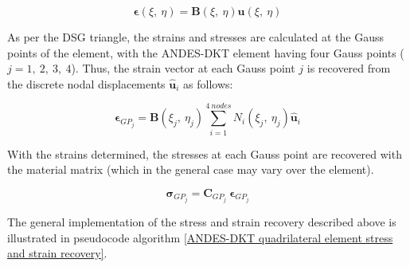 \begin{equation} 
\boldsymbol{\epsilon}(\xi,\ \eta) = \mathbf{B}(\xi,\ \eta) \mathbf{u}(\xi,\ \eta)
\label{eqqrec2}
\end{equation}

As per the DSG triangle, the strains and stresses are calculated at the Gauss points of the element, with the ANDES-DKT element having four Gauss points ($j = 1,\ 2,\ 3,\ 4$). Thus, the strain vector at each Gauss point $j$ is recovered from the discrete nodal displacements $\hat{\mathbf{u}}_i$ as follows:

\begin{equation} 
\boldsymbol{\epsilon}_{GP_j} = \mathbf{B}(\xi_j,\ \eta_j) \sum_{i=1}^{4\ nodes} N_i(\xi_j,\ \eta_j) \hat{\mathbf{u}}_i
\label{eqqrec3}
\end{equation}

With the strains determined, the stresses at each Gauss point are recovered with the material matrix (which in the general case may vary over the element).

\begin{equation} 
\boldsymbol{\sigma}_{GP_j} = \mathbf{C}_{GP_j}\ \boldsymbol{\epsilon}_{GP_j}
\label{eqqrec4}
\end{equation}

The general implementation of the stress and strain recovery described above is illustrated in pseudocode algorithm \ref{ANDES-DKT quadrilateral element stress and strain recovery}.

